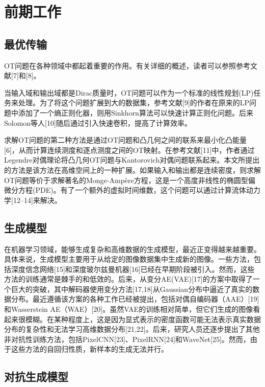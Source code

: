 
\section{前期工作}

\subsection{最优传输}

OT问题在各种领域中都起着重要的作用。有关详细的概述，读者可以参照参考文献[7]和[8]。

当输入域和输出域都是Dirac质量时，OT问题可以作为一个标准的线性规划(LP)任务来处理。为了将这个问题扩展到大的数据集，参考文献[9]的作者在原来的LP问题中添加了一个熵正则化器，则用Sinkhorn算法可以快速计算正则化问题。后来Solomon等人[10]随后通过引入快速卷积，提高了计算效率。

求解OT问题的第二种方法是通过OT问题和凸几何之间的联系来最小化凸能量[6]，从而计算连续测度和逐点测度之间的OT映射。在参考文献[11]中，作者通过Legendre对偶理论将凸几何OT问题与Kantorovich对偶问题联系起来。本文所提出的方法是该方法在高维空间上的一种扩展。如果输入和输出都是连续密度，则求解OT问题等价于求解著名的Monge-Ampère方程，这是一个高度非线性的椭圆型偏微分方程(PDE)。有了一个额外的虚拟时间维数，这个问题可以通过计算流体动力学[12–14]来解决。

\subsection{生成模型}

在机器学习领域，能够生成复杂和高维数据的生成模型，最近正变得越来越重要。具体来说，生成模型主要用于从给定的图像数据集中生成新的图像。一些方法，包括深度信念网络[15]和深度玻尔兹曼机器[16]已经在早期阶段被引入。然而，这些方法的训练通常是棘手的和低效的。后来，从变分AE(VAE)[17]的方案中取得了一个巨大的突破，其中解码器使用变分方法[17,18]从Gaussian分布中逼近了真实的数据分布。最近遵循该方案的各种工作已经被提出，包括对偶自编码器（AAE）[19]和Wasserstein AE（WAE）[20]。虽然VAE的训练相对简单，但它们生成的图像看起来很模糊。在某种程度上，这是因为显式表示的密度函数可能无法表示真实数据分布的复杂性和无法学习高维数据分布[21,22]。后来，研究人员还逐步提出了其他非对抗性训练方法，包括PixelCNN[23]、PixelRNN[24]和WaveNet[25]。然而，由于这些方法的自回归性质，新样本的生成无法并行。

\subsection{对抗生成模型}

